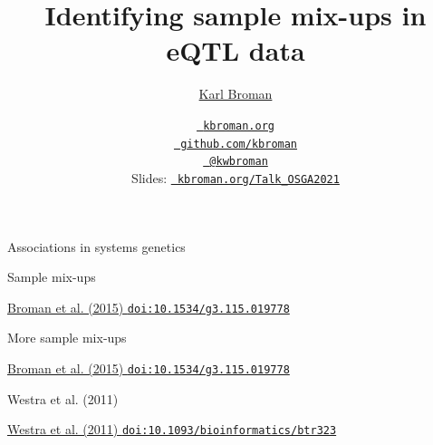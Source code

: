 \documentclass[12pt,t,aspectratio=169]{beamer}
\title{Identifying sample mix-ups in eQTL data}
\author{\href{https://kbroman.org}{Karl Broman}}
\institute{Biostatistics \& Medical Informatics, Univ.\ Wisconsin{\textendash}Madison}
\date{\href{https://kbroman.org}{\tt \scriptsize \color{foreground} kbroman.org}
\\[-4pt]
\href{https://github.com/kbroman}{\tt \scriptsize \color{foreground} github.com/kbroman}
\\[-4pt]
\href{https://twitter.com/kwbroman}{\tt \scriptsize \color{foreground} @kwbroman}
\\[2pt]
\scriptsize {\lolit Slides:} \href{https://kbroman.org/Talk_OSGA2021}{\tt \scriptsize
  \color{foreground} kbroman.org/Talk\_OSGA2021}
}
\begin{document}
{
 }


\begin{frame}[c]{Associations in systems genetics}
\end{frame}


\begin{frame}[c]{Sample mix-ups}

  \vspace{2pt}


  \vspace{-12pt}
  \hfill \href{https://doi.org/10.1534/g3.115.019778}{\lolit
    \scriptsize Broman et al. (2015) {\tt doi:10.1534/g3.115.019778}}

\end{frame}


\begin{frame}[c]{More sample mix-ups}

  \vspace{2pt}


  \hfill \href{https://doi.org/10.1534/g3.115.019778}{\lolit
    \scriptsize Broman et al. (2015) {\tt doi:10.1534/g3.115.019778}}

\end{frame}



\begin{frame}[c]{Westra et al. (2011)}

\vspace{10mm}


  \vspace{10mm}
  \hfill \href{https://doi.org/10.1093/bioinformatics/btr323}{\lolit
    \scriptsize Westra et al. (2011) {\tt doi:10.1093/bioinformatics/btr323}}

\end{frame}
\end{document}
